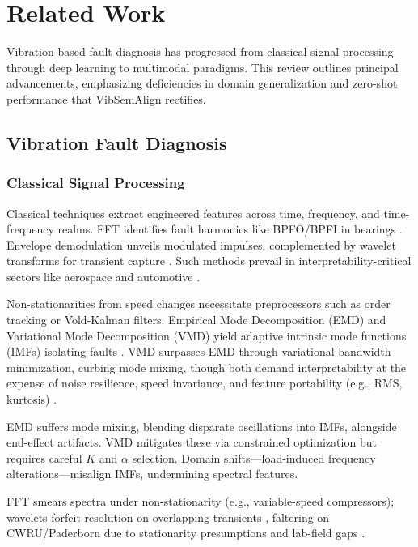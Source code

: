 \section{Related Work}

Vibration-based fault diagnosis has progressed from classical signal processing through deep learning to multimodal paradigms. This review outlines principal advancements, emphasizing deficiencies in domain generalization and zero-shot performance that VibSemAlign rectifies.

\subsection{Vibration Fault Diagnosis}
\subsubsection{Classical Signal Processing}

Classical techniques extract engineered features across time, frequency, and time-frequency realms. FFT identifies fault harmonics like BPFO/BPFI in bearings \cite{randall2011vibration}. Envelope demodulation unveils modulated impulses, complemented by wavelet transforms for transient capture \cite{lei2018review}. Such methods prevail in interpretability-critical sectors like aerospace and automotive \cite{randall2011vibration}.

Non-stationarities from speed changes necessitate preprocessors such as order tracking or Vold-Kalman filters. Empirical Mode Decomposition (EMD) and Variational Mode Decomposition (VMD) yield adaptive intrinsic mode functions (IMFs) isolating faults \cite{dragomiretskiy2014emd}. VMD surpasses EMD through variational bandwidth minimization, curbing mode mixing, though both demand interpretability at the expense of noise resilience, speed invariance, and feature portability (e.g., RMS, kurtosis) \cite{wen2020domain}.

EMD suffers mode mixing, blending disparate oscillations into IMFs, alongside end-effect artifacts. VMD mitigates these via constrained optimization but requires careful $K$ and $\alpha$ selection. Domain shifts---load-induced frequency alterations---misalign IMFs, undermining spectral features.

FFT smears spectra under non-stationarity (e.g., variable-speed compressors); wavelets forfeit resolution on overlapping transients \cite{casewestern,paderborn}, faltering on CWRU/Paderborn due to stationarity presumptions and lab-field gaps \cite{casewestern,paderborn}.

